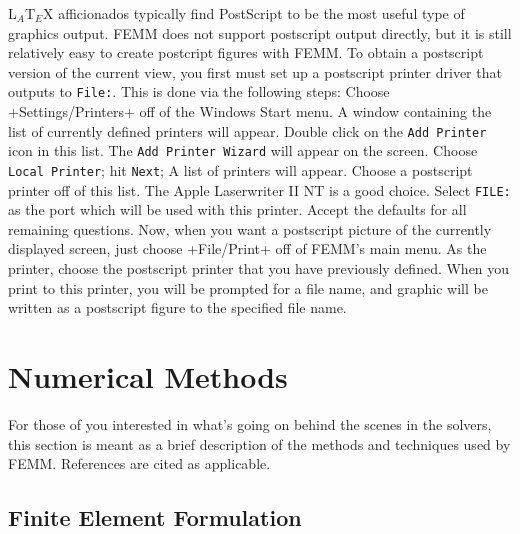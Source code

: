 \documentclass[12pt]{report}
\begin{document}
L$_{A}$T$_{E}$X afficionados typically find PostScript to be the
most useful type of graphics output. FEMM does not support
postscript output directly, but it is still relatively easy to
create postcript figures with FEMM. To obtain a postscript version
of the current view, you first must set up a postscript printer
driver that outputs to \texttt{File:}. This is done via the
following steps: Choose +Settings/Printers+ off of the Windows
Start menu. A window containing the list of currently defined
printers will appear. Double click on the \texttt{Add Printer} icon
in this list. The
\texttt{Add Printer Wizard} will appear on the screen. Choose \texttt{Local
Printer}; hit \texttt{Next}; A list of printers will appear. Choose
a postscript printer off of this list. The Apple Laserwriter II NT
is a good choice. Select \texttt{FILE:} as the port which will be
used with this printer. Accept the defaults for all remaining
questions. Now, when you want a postscript picture of the currently
displayed screen, just choose +File/Print+ off of FEMM's main menu.
As the printer, choose the postscript printer that you have
previously defined. When you print to this printer, you will be
prompted for a file name, and graphic will be written as a
postscript figure to the specified file name.

%
%















\chapter{Numerical Methods}  \label{fkern_stuff}

For those of you interested in what's going on behind the scenes in
the solvers, this section is meant as a brief description of the
methods and techniques used by FEMM. References are cited as
applicable.

\section{Finite Element Formulation}
\end{document}
